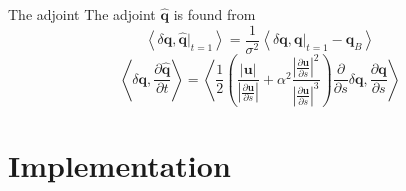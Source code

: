 \documentclass{beamer}
\newcommand{\vect}[1]{\ensuremath{\mathbf{#1}}}
\newcommand{\hvect}[1]{\ensuremath{\hat{\vect{#1}}}}
\newcommand{\pp}[2]{\frac{\partial #1}{\partial #2}}
\newcommand{\angles}[1]{\left\langle #1 \right\rangle}
\begin{document}

\begin{frame}{The adjoint}
The adjoint $\hvect q$ is found from
\begin{equation}
  \label{eq:qh_t1}
  \angles{\delta \vect q, \hvect q\big|_{t=1}} = \frac{1}{\sigma^2}\angles{\delta \vect q, \vect q \big|_{t=1} - \vect q_B}
\end{equation}
\begin{equation}
  \label{eq:dqhdt}
  \angles{\delta \vect q, \pp{\hvect q}{t}} = \angles{\frac{1}{2}\left(\frac{\left|\vect u\right|}{\left|\pp{\vect u}{s}\right|} + \alpha^2\frac{\left|\pp{\vect u}{s}\right|^2}{\left|\pp{\vect u}{s}\right|^3}\right)\pp{}{s}\delta \vect q, \pp{\vect q}{s}}
  \end{equation}
\end{frame}

\section{Implementation}
\end{document}
